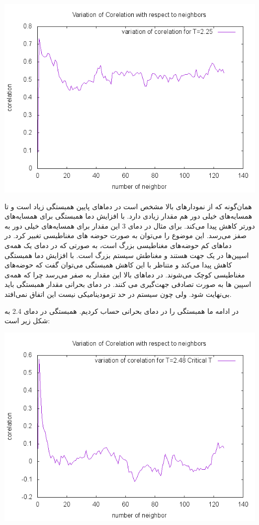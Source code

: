 \documentclass[a4paper,12pt]{article}
\begin{document}
\begin{center}
\includegraphics[scale=.8]{C5.png}
\end{center}

همان‌گونه که از نمودار‌های بالا مشخص است
در دما‌های پایین همبستگی زیاد است و تا همسایه‌های خیلی
دور هم مقدار زیادی دارد.
با افزایش دما همبستگی برای همسایه‌های 
دورتر کاهش پیدا می‌کند. برای مثال در دمای 3 این مقدار برای
همسایه‌های خیلی دور به صفز می‌رسد.
این موضوع را می‌توان به صورت حوضه های مغناطیسی تغبیر کرد.
در دما‌های کم حوضه‌های مغناطیسی بزرگ است، به صورتی که در دمای یک همه‌ی اسپین‌ها
در یک جهت هستند و مغناطش سیستم بزرگ است.
با افزایش دما همبستگی کاهش پیدا می‌کند
و متناظر با این کاهش همبستگی می‌توان گفت که حوضه‌های مغناطیسی
کوچک می‌شوند.
در دماهای بالا این مقدار به صفر می‌رسد
چرا که همه‌ی اسپین ها به صورت تصادفی جهت‌گیری می کنند.
در دمای بحرانی مقدار همبستگی باید بی‌نهایت شود.
ولی چون سیستم در حد تزمودینامیکی نیست این اتفاق نمی‌افتد.

 در ادامه ما همبستگی را در دمای بحرانی حساب کردیم.
 همبستگی در دمای 2.4 به شکل زیر است:
\begin{center}
 \includegraphics[scale=1]{C6.png}
\end{center}
\end{document}
